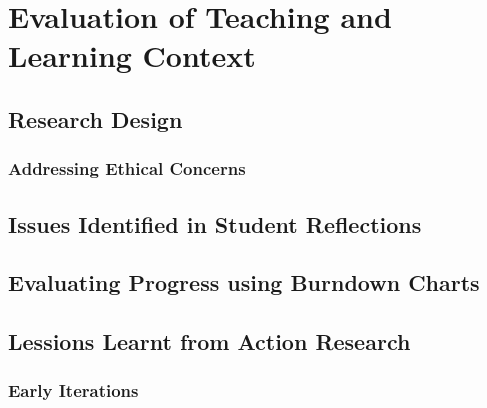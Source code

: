 
\chapter{Evaluation of Teaching and Learning Context} %
\label{cha:evaluation}


\section{Research Design} %
\label{sec:research_design}

\subsection{Addressing Ethical Concerns} %
\label{sub:addressing_ethical_concerns}



\section{Issues Identified in Student Reflections} %
\label{sec:issues_identified_in_student_reflections}


\section{Evaluating Progress using Burndown Charts} %
\label{sec:evaluating_progress_using_burndown_charts}


\section{Lessions Learnt from Action Research} %
\label{sec:lessions_learnt_from_action_research}


\subsection{Early Iterations} %
\label{sub:early_iterations}

